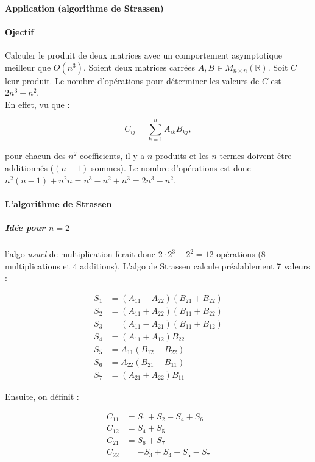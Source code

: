 \documentclass{article}
\begin{document}
			\paragraph{Application (algorithme de Strassen)}

			\paragraph{Ojectif} Calculer le produit de deux matrices avec un comportement asymptotique meilleur que $O(n^3)$. Soient deux matrices carrées $A, B \in M_{n \times n}(\mathbb R)$.
			Soit $C$ leur produit. Le nombre d'opérations pour déterminer les valeurs de $C$ est $2n^3 - n^2$.\\
			En effet, vu que :

			\[C_{ij} = \sum_{k=1}^nA_{ik}B_{kj},\]

			pour chacun des $n^2$ coefficients, il y a $n$ produits et les $n$ termes doivent être additionnés ($(n-1)$ sommes). Le nombre d'opérations est donc
			$n^2(n-1) + n^2 n = n^3-n^2+n^3 = 2n^3-n^2$.

			\paragraph{L'algorithme de Strassen}

			\subparagraph{Idée pour $n = 2$} l'algo \textit{usuel} de multiplication ferait donc $2 \cdot 2^3 - 2^2 = 12$ opérations (8 multiplications et 4 additions).
			L'algo de Strassen calcule préalablement 7 valeurs :
			
			\begin{align*}
				S_1 &= (A_{11} - A_{22})(B_{21} + B_{22}) \\
				S_2 &= (A_{11} + A_{22})(B_{11} + B_{22}) \\
				S_3 &= (A_{11} - A_{21})(B_{11} + B_{12}) \\
				S_4 &= (A_{11} + A_{12})B_{22} \\
				S_5 &= A_{11}(B_{12}-B_{22}) \\
				S_6 &= A_{22}(B_{21} - B_{11}) \\
				S_7 &= (A_{21} + A_{22})B_{11}
			\end{align*}

			Ensuite, on définit :

			\begin{align*}
				C_{11} &= S_1 + S_2 - S_4 + S_6 \\
				C_{12} &= S_4 + S_5 \\
				C_{21} &= S_6 + S_7 \\
				C_{22} &= -S_3 + S_4 + S_5 - S_7
			\end{align*}
\end{document}
